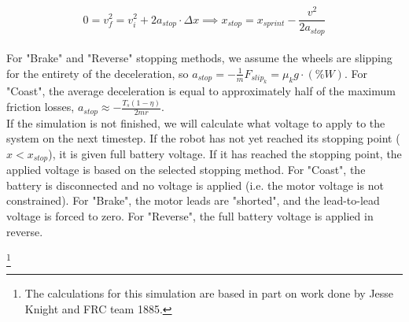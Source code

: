 \documentclass[a4paper]{article}
\newcommand\blfootnote[1]{%
	\begingroup
	\renewcommand\thefootnote{}\footnote{#1}%
	\addtocounter{footnote}{-1}%
	\endgroup
}
\begin{document}
	\begin{equation}
		0 = v_f^2 = v_i^2 + 2a_{stop} \cdot \Delta x \implies x_{stop} = x_{sprint} - \frac{v^2}{2a_{stop}}
	\end{equation}\\

	For "Brake" and "Reverse" stopping methods, we assume the wheels are slipping for the entirety of the deceleration, so $ a_{stop} = - \frac{1}{m} F_{slip_k} = \mu_k g \cdot \left( \% W \right) $. For "Coast", the average deceleration is equal to approximately half of the maximum friction losses, $ a_{stop} \approx -\frac{T_s \left( 1-\eta \right)}{2 m r} $.\\
	
	If the simulation is not finished, we will calculate what voltage to apply to the system on the next timestep. If the robot has not yet reached its stopping point ($ x < x_{stop} $), it is given full battery voltage. If it has reached the stopping point, the applied voltage is based on the selected stopping method. For "Coast", the battery is disconnected and no voltage is applied (i.e. the motor voltage is not constrained). For "Brake", the motor leads are "shorted", and the lead-to-lead voltage is forced to zero. For "Reverse", the full battery voltage is applied in reverse.
	
	\blfootnote{The calculations for this simulation are based in part on work done by Jesse Knight and FRC team 1885.}
	
	
	
	
	
	
\end{document}
